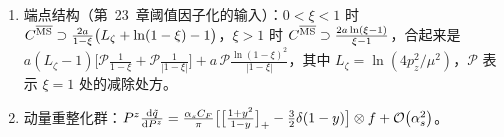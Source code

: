 \begin{proposition}
\begin{enumerate}[label=(\alph*),leftmargin=2em,itemsep=2pt,topsep=2pt]
\begin{equation}
\begin{split}
\end{split}
\end{equation}
\begin{equation}\label{eq:lamet-Cratio}
C^{\rm ratio}(\xi)=\delta(1-\xi)+a\begin{cases}\big[\frac{1+\xi^2}{1-\xi}\ln\frac\xi{\xi-1}+1-\frac3{2(1-\xi)}\big]^{[1,\infty]}_{+(1)},&\xi>1\\[3pt]\big[\frac{1+\xi^2}{1-\xi}\big(-\ell_p+\ln(\xi(1-\xi))-1\big)+1+\frac3{2(1-\xi)}\big]^{[0,1]}_{+(1)},&0<\xi<1\\[3pt]\big[-\frac{1+\xi^2}{1-\xi}\ln\frac{-\xi}{1-\xi}-1+\frac3{2(1-\xi)}\big]^{[-\infty,0]}_{+(1)},&\xi<0\end{cases}
\end{equation}%
对 $\gamma^z$，$\MSbar$ 核加 $2a(1-\xi)\theta(0<\xi<1)$，比值核加 $a[2(1-\xi)]^{[0,1]}_{+(1)}$。
\item 端点结构（第~23~章阈值因子化的输入）：$0<\xi<1$ 时 $C^{\overline{\mathrm{MS}}}\supset\frac{2a}{1-\xi}\big(L_\zeta+\ln(1-\xi)-1\big)$，$\xi>1$ 时 $C^{\overline{\mathrm{MS}}}\supset\frac{2a\ln(\xi-1)}{\xi-1}$，合起来是
$a(L_\zeta-1)\big[\mathcal P\frac1{1-\xi}+\mathcal P\frac1{|1-\xi|}\big]+a\,\mathcal P\frac{\ln(1-\xi)^2}{|1-\xi|}$，其中 $L_\zeta=\ln(4p_z^2/\mu^2)$，$\mathcal P$ 表示 $\xi=1$ 处的减除处方。
\item 动量重整化群：$P^z\frac{\mathrm{d}\tilde q}{\mathrm{d} P^z}=\frac{\alpha_s C_F}\pi\big[\big[\frac{1+y^2}{1-y}\big]_+-\frac32\delta(1-y)\big]\otimes f+\mathcal{O}\!\left(\alpha_s^2\right)$。
\end{enumerate}
\end{proposition}

